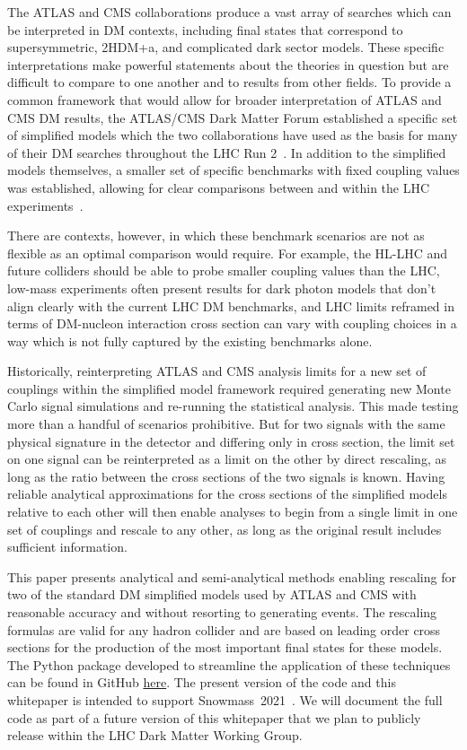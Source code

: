 \documentclass[a4paper, 11pt]{article}
\begin{document}
The ATLAS and CMS collaborations produce a vast array of searches which can be interpreted in DM contexts, including final states that correspond to supersymmetric, 2HDM+a, and complicated dark sector models. These specific interpretations make powerful statements about the theories in question but are difficult to compare to one another and to results from other fields. To provide a common framework that would allow for broader interpretation of ATLAS and CMS DM results, the ATLAS/CMS Dark Matter Forum established a specific set of simplified models which the two collaborations have used as the basis for many of their DM searches throughout the LHC Run 2~\cite{ABERCROMBIE2020100371}. In addition to the simplified models themselves, a smaller set of specific benchmarks with fixed coupling values was established, allowing for clear comparisons between and within the LHC experiments~\cite{BOVEIA2020100365,ALBERT2019100377,ATL-PHYS-PUB-2020-021,CMSSummary}.

There are contexts, however, in which these benchmark scenarios are not as flexible as an optimal comparison would require. For example, the HL-LHC and future colliders should be able to probe smaller coupling values than the LHC, low-mass experiments often present results for dark photon models that don't align clearly with the current LHC DM benchmarks, and LHC limits reframed in terms of DM-nucleon interaction cross section can vary with coupling choices in a way which is not fully captured by the existing benchmarks alone.

Historically, reinterpreting ATLAS and CMS analysis limits for a new set of couplings within the simplified model framework required generating new Monte Carlo signal simulations and re-running the statistical analysis. This made testing more than a handful of scenarios prohibitive. But for two signals with the same physical signature in the detector and differing only in cross section, the limit set on one signal can be reinterpreted as a limit on the other by direct rescaling, as long as the ratio between the cross sections of the two signals is known. Having reliable analytical approximations for the cross sections of the simplified models relative to each other will then enable analyses to begin from a single limit in one set of couplings and rescale to any other, as long as the original result includes sufficient information. 

This paper presents analytical and semi-analytical methods enabling rescaling for two of the standard DM simplified models used by ATLAS and CMS with reasonable accuracy and without resorting to generating events. The rescaling formulas are valid for any hadron collider and are based on leading order cross sections for the production of the most important final states for these models. The Python package developed to streamline the application of these techniques can be found in GitHub \href{https://github.com/LHC-DMWG/DMWG-couplingScan-code}{here}. The present version of the code and this whitepaper is intended to support Snowmass~2021~\cite{snowmass21}. We will document the full code as part of a future version of this whitepaper that we plan to publicly release within the LHC Dark Matter Working Group. 
\end{document}
